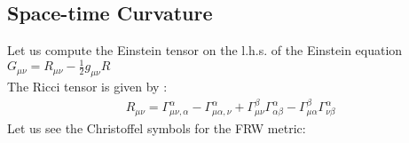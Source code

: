 \subsection{Space-time Curvature}
\hspace{0.5cm}Let us compute the Einstein tensor on the l.h.s. of the Einstein equation $G_{\mu \nu } = R_{\mu \nu } - \frac{1}{2} g_{\mu \nu } R$ \\ 
The Ricci tensor is given by :
\begin{align}
        R_{\mu \nu } = \Gamma^{\alpha }_{\mu \nu , \alpha } 
        - \Gamma^{\alpha }_{\mu \alpha , \nu }
        + \Gamma^{\beta }_{\mu \nu } \Gamma^{\alpha }_{\alpha \beta } 
        - \Gamma^{\beta}_{\mu \alpha } \Gamma^{\alpha }_{\nu \beta }
\end{align}
Let us see the Christoffel symbols for the FRW metric:\label{1.12}
